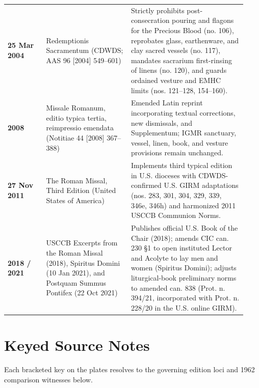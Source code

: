 {\begin{longtable}{>{\raggedright\arraybackslash}p{0.15\linewidth}>{\raggedright\arraybackslash}p{0.33\linewidth}>{\raggedright\arraybackslash}p{0.45\linewidth}}
\textbf{25 Mar 2004} & Redemptionis Sacramentum (CDWDS; AAS 96 [2004] 549--601) & Strictly prohibits post-consecration pouring and flagons for the Precious Blood (no. 106), reprobates glass, earthenware, and clay sacred vessels (no. 117), mandates sacrarium first-rinsing of linens (no. 120), and guards ordained vesture and EMHC limits (nos. 121--128, 154--160). \\
\textbf{2008} & Missale Romanum, editio typica tertia, reimpressio emendata (Notitiae 44 [2008] 367--388) & Emended Latin reprint incorporating textual corrections, new dismissals, and Supplementum; IGMR sanctuary, vessel, linen, book, and vesture provisions remain unchanged. \\
\textbf{27 Nov 2011} & The Roman Missal, Third Edition (United States of America) & Implements third typical edition in U.S. dioceses with CDWDS-confirmed U.S. GIRM adaptations (nos. 283, 301, 304, 329, 339, 346e, 346h) and harmonized 2011 USCCB Communion Norms. \\
\textbf{2018 / 2021} & USCCB Excerpts from the Roman Missal (2018), Spiritus Domini (10 Jan 2021), and Postquam Summus Pontifex (22 Oct 2021) & Publishes official U.S. Book of the Chair (2018); amends CIC can. 230 §1 to open instituted Lector and Acolyte to lay men and women (Spiritus Domini); adjusts liturgical-book preliminary norms to amended can. 838 (Prot. n. 394/21, incorporated with Prot. n. 228/20 in the U.S. online GIRM). \\
\bottomrule
\end{longtable}}

\clearpage
\section{Keyed Source Notes}
Each bracketed key on the plates resolves to the governing edition loci and 1962 comparison witnesses below.

